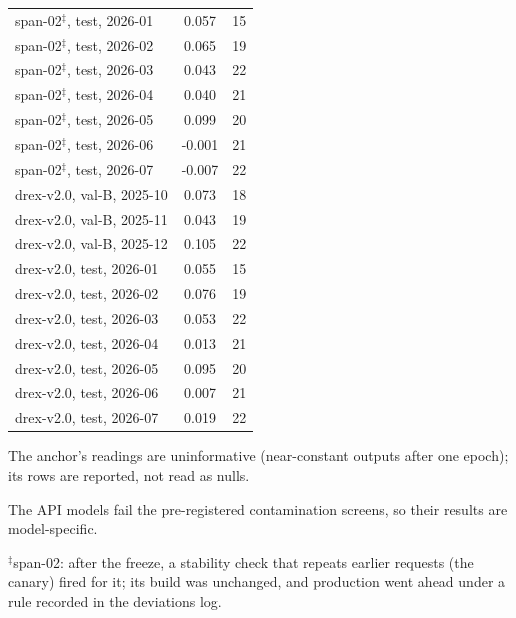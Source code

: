 \begin{longtable}{@{}lS[table-format=-1.3]S[table-format=2.0]@{}}
span-02$^{\ddagger}$, test, 2026-01 & 0.057 & 15 \\
span-02$^{\ddagger}$, test, 2026-02 & 0.065 & 19 \\
span-02$^{\ddagger}$, test, 2026-03 & 0.043 & 22 \\
span-02$^{\ddagger}$, test, 2026-04 & 0.040 & 21 \\
span-02$^{\ddagger}$, test, 2026-05 & 0.099 & 20 \\
span-02$^{\ddagger}$, test, 2026-06 & -0.001 & 21 \\
span-02$^{\ddagger}$, test, 2026-07 & -0.007 & 22 \\
drex-v2.0, val-B, 2025-10 & 0.073 & 18 \\
drex-v2.0, val-B, 2025-11 & 0.043 & 19 \\
drex-v2.0, val-B, 2025-12 & 0.105 & 22 \\
drex-v2.0, test, 2026-01 & 0.055 & 15 \\
drex-v2.0, test, 2026-02 & 0.076 & 19 \\
drex-v2.0, test, 2026-03 & 0.053 & 22 \\
drex-v2.0, test, 2026-04 & 0.013 & 21 \\
drex-v2.0, test, 2026-05 & 0.095 & 20 \\
drex-v2.0, test, 2026-06 & 0.007 & 21 \\
drex-v2.0, test, 2026-07 & 0.019 & 22 \\
\end{longtable}
\endgroup
\vspace{-0.5\baselineskip}
{\footnotesize\raggedright
The anchor's readings are uninformative (near-constant outputs after one epoch); its rows are reported, not read as nulls.\par
The API models fail the pre-registered contamination screens, so their results are model-specific.\par
$^{\ddagger}$span-02: after the freeze, a stability check that repeats earlier requests (the canary) fired for it; its build was unchanged, and production went ahead under a rule recorded in the deviations log.\par
}
